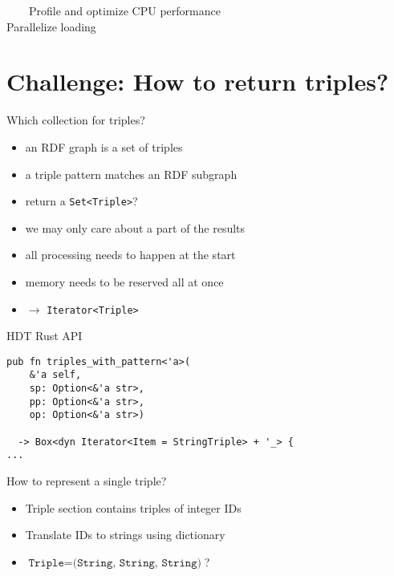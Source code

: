 \documentclass[14pt,aspectratio=169]{beamer}
\newcommand{\imageslide}[4][]
{
\begin{frame}[plain]{~~~~#2}
\vspace{0.2em}
\centering\makebox[\linewidth]{\texttt{[image: \#3]}}
\\#1
\note{#4}
\end{frame}
}
\newcommand\con{\item[$-$]}
\begin{document}
\imageslide[Parallelize loading]{Profile and optimize CPU performance}{img/parallel.png}{}

\section{Challenge: How to return triples?}

\begin{frame}{Which collection for triples?}
\begin{itemize}
\item an RDF graph is a set of triples
\item a triple pattern matches an RDF subgraph
\item return a \texttt{Set<Triple>}?
\pause
\con we may only care about a part of the results
\con all processing needs to happen at the start
\con memory needs to be reserved all at once
\item $\rightarrow$ \texttt{Iterator<Triple>}
\end{itemize}
\end{frame}

\begin{frame}[fragile]{HDT Rust API}
\small
\begin{verbatim}
pub fn triples_with_pattern<'a>(
    &'a self,
    sp: Option<&'a str>,
    pp: Option<&'a str>,
    op: Option<&'a str>)

  -> Box<dyn Iterator<Item = StringTriple> + '_> {
...
\end{verbatim}
\end{frame}

\begin{frame}{How to represent a single triple?}
\centering
{}\\
\begin{itemize}
\item Triple section contains triples of integer IDs
\item Translate IDs to strings using dictionary
\item $\texttt{Triple} = \texttt{(String, String, String)}$?
\end{itemize}
\end{frame}
\end{document}
